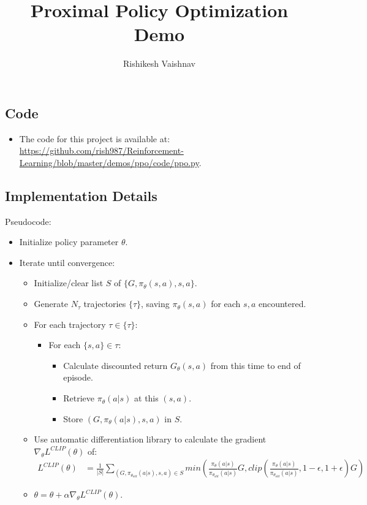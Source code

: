 \documentclass[a4paper]{article}
\title{Proximal Policy Optimization Demo}
\author{Rishikesh Vaishnav}
\begin{document}
\maketitle
\subsection*{Code}
\begin{itemize}
    \item The code for this project is available at: 
    \url{https://github.com/rish987/Reinforcement-Learning/blob/master/demos/ppo/code/ppo.py}.
\end{itemize}
\subsection*{Implementation Details}
Pseudocode:
\begin{itemize}
    \item Initialize policy parameter $\theta$.
    \item Iterate until convergence:
    \begin{itemize}
        \item Initialize/clear list $S$ of $\{G, \pi_{\theta}(s, a), s, a\}$.
        \item Generate $N_{\tau}$ trajectories $\{\tau\}$, saving 
            $\pi_{\theta}(s, a)$ for each $s, a$ encountered.
        \item For each trajectory $\tau \in \{\tau\}$:
        \begin{itemize}
            \item For each $\{s, a\} \in \tau$:
            \begin{itemize}
                \item Calculate discounted return $G_{\theta}(s, a)$ from this
                    time to end of episode.
                \item Retrieve $\pi_{\theta}(a | s)$ at this $(s, a)$.
                \item Store $(G, \pi_{\theta}(a | s), s, a)$ in $S$.
            \end{itemize}
        \end{itemize}
        \item Use automatic differentiation library to calculate the gradient
            $\nabla_{\theta}L^{CLIP}(\theta)$ of:
        \begin{align*}
            L^{CLIP}(\theta) &= \frac{1}{|S|}\sum_{(G, \pi_{\theta_{old}}(a |
            s), s, a) \in S} min\left(\frac{\pi_{\theta}(a |
            s)}{\pi_{\theta_{old}}(a | s)}G, clip\left(\frac{\pi_{\theta}(a |
            s)}{\pi_{\theta_{old}}(a | s)}, 1 - \epsilon, 1 +
            \epsilon\right)G\right)
        \end{align*}
        \item $\theta = \theta + \alpha\nabla_{\theta}L^{CLIP}(\theta)$.
    \end{itemize}
\end{itemize}
\end{document}

